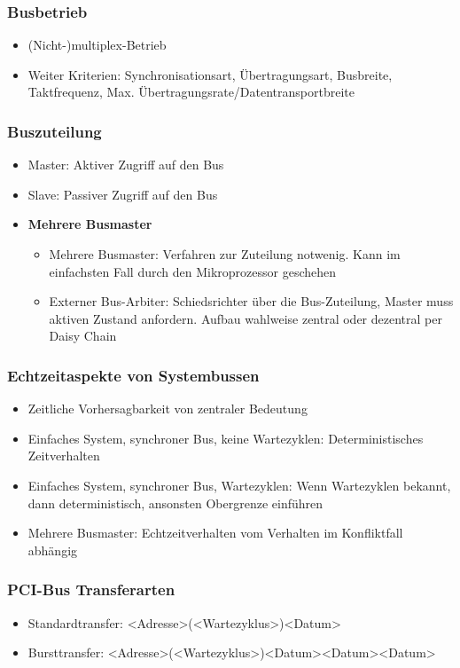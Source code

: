 \subsubsection{Busbetrieb}
\begin{itemize}
	\item (Nicht-)multiplex-Betrieb
	\item Weiter Kriterien: Synchronisationsart, Übertragungsart, Busbreite, Taktfrequenz, Max. Übertragungsrate/Datentransportbreite
\end{itemize}

\subsubsection{Buszuteilung}
\begin{itemize}
	\item Master: Aktiver Zugriff auf den Bus
	\item Slave: Passiver Zugriff auf den Bus
	\item \textbf{Mehrere Busmaster}
	\begin{itemize}
		\item Mehrere Busmaster: Verfahren zur Zuteilung notwenig. Kann im einfachsten Fall durch den Mikroprozessor geschehen
		\item Externer Bus-Arbiter: Schiedsrichter über die Bus-Zuteilung, Master muss aktiven Zustand anfordern. Aufbau wahlweise zentral oder dezentral per Daisy Chain
	\end{itemize}
\end{itemize}

\subsubsection{Echtzeitaspekte von Systembussen}
\begin{itemize}
	\item Zeitliche Vorhersagbarkeit von zentraler Bedeutung
	\item Einfaches System, synchroner Bus, keine Wartezyklen: Deterministisches Zeitverhalten
	\item Einfaches System, synchroner Bus, Wartezyklen: Wenn Wartezyklen bekannt, dann deterministisch, ansonsten Obergrenze einführen
	\item Mehrere Busmaster: Echtzeitverhalten vom Verhalten im Konfliktfall abhängig
\end{itemize}

\subsubsection{PCI-Bus Transferarten}
\begin{itemize}
	\item Standardtransfer: <Adresse>(<Wartezyklus>)<Datum>
	\item Bursttransfer: <Adresse>(<Wartezyklus>)<Datum><Datum><Datum>
\end{itemize}


